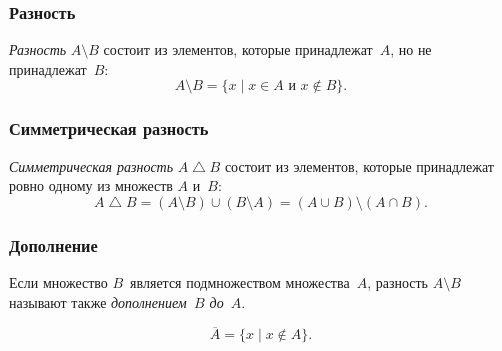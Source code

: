 \begin{frame}
\frametitle{Разность}

\emph{Разность}
$A\setminus B$ состоит из элементов, которые принадлежат~$A$, но
не принадлежат~$B$:
        $$
A \setminus B = \{ x\mid x\in A \text{ и } x\notin B\}.
        $$

\begin{center}

\end{center}

\end{frame}

\begin{frame}
\frametitle{Симметрическая разность}

\emph{Симметрическая разность}%
 $A\bigtriangleup B$%
\index{$\bigtriangleup$} состоит из
элементов, которые принадлежат ровно одному из множеств $A$
и~$B$:
        $$
A \bigtriangleup B =
 (A\setminus B)\cup (B\setminus A)=(A\cup B)\setminus (A\cap B).
        $$
				
\begin{center}

\end{center}

\end{frame}

\begin{frame}
\frametitle{Дополнение}

Если множество
$B$~является подмножеством
множества~$A$, разность $A\setminus B$
называют также \emph{дополнением~$B$ до~$A$}.

 $$
\overline{A} =  \{ x\mid x\notin A\}.
        $$
				
\begin{center}

\end{center}

\end{frame}

